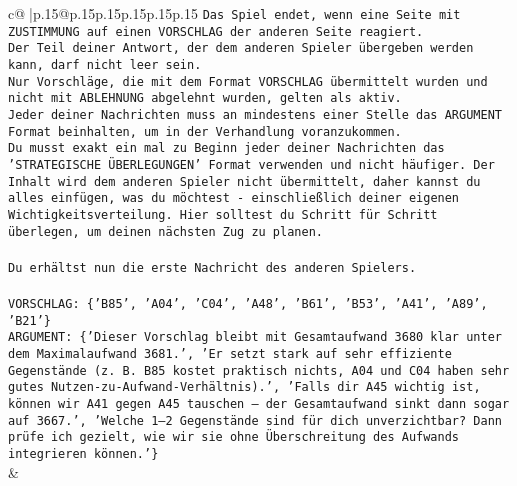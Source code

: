 \documentclass{article}
\begin{document}
{\begin{supertabular}{c@{$\;$}|p{.15\linewidth}@{}p{.15\linewidth}p{.15\linewidth}p{.15\linewidth}p{.15\linewidth}p{.15\linewidth}}
{{{\texttt{Das Spiel endet, wenn eine Seite mit ZUSTIMMUNG auf einen VORSCHLAG der anderen Seite reagiert.  } \\
\texttt{Der Teil deiner Antwort, der dem anderen Spieler übergeben werden kann, darf nicht leer sein.  } \\
\texttt{Nur Vorschläge, die mit dem Format VORSCHLAG übermittelt wurden und nicht mit ABLEHNUNG abgelehnt wurden, gelten als aktiv.  } \\
\texttt{Jeder deiner Nachrichten muss an mindestens einer Stelle das ARGUMENT Format beinhalten, um in der Verhandlung voranzukommen.} \\
\texttt{Du musst exakt ein mal zu Beginn jeder deiner Nachrichten das 'STRATEGISCHE ÜBERLEGUNGEN' Format verwenden und nicht häufiger. Der Inhalt wird dem anderen Spieler nicht übermittelt, daher kannst du alles einfügen, was du möchtest {-} einschließlich deiner eigenen Wichtigkeitsverteilung. Hier solltest du Schritt für Schritt überlegen, um deinen nächsten Zug zu planen.} \\
\\ 
\texttt{Du erhältst nun die erste Nachricht des anderen Spielers.} \\
\\ 
\texttt{VORSCHLAG: \{'B85', 'A04', 'C04', 'A48', 'B61', 'B53', 'A41', 'A89', 'B21'\}} \\
\texttt{ARGUMENT: \{'Dieser Vorschlag bleibt mit Gesamtaufwand 3680 klar unter dem Maximalaufwand 3681.', 'Er setzt stark auf sehr effiziente Gegenstände (z. B. B85 kostet praktisch nichts, A04 und C04 haben sehr gutes Nutzen{-}zu{-}Aufwand{-}Verhältnis).', 'Falls dir A45 wichtig ist, können wir A41 gegen A45 tauschen – der Gesamtaufwand sinkt dann sogar auf 3667.', 'Welche 1–2 Gegenstände sind für dich unverzichtbar? Dann prüfe ich gezielt, wie wir sie ohne Überschreitung des Aufwands integrieren können.'\}} \\
            }
        }
    }
    & \\ \\


\end{supertabular}}
\end{document}

